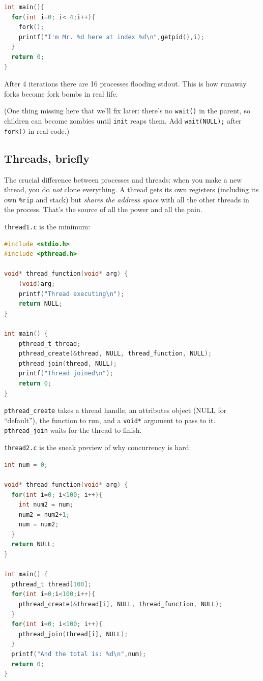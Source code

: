 \documentclass[11pt]{article}
\begin{document}
\begin{lstlisting}[language=C]
int main(){
  for(int i=0; i< 4;i++){
    fork();
    printf("I'm Mr. %d here at index %d\n",getpid(),i);
  }
  return 0;
}
\end{lstlisting}

After 4 iterations there are 16 processes flooding stdout. This is
how runaway forks become fork bombs in real life.

(One thing missing here that we'll fix later: there's no
\texttt{wait()} in the parent, so children can become zombies until
\texttt{init} reaps them. Add \texttt{wait(NULL);} after \texttt{fork()}
in real code.)

\subsection*{Threads, briefly}

The crucial difference between processes and threads: when you
make a new thread, you do \emph{not} clone everything. A thread
gets its own registers (including its own \texttt{\%rip} and stack)
but \emph{shares the address space} with all the other threads in
the process. That's the source of all the power and all the pain.

\texttt{thread1.c} is the minimum:

\begin{lstlisting}[language=C]
#include <stdio.h>
#include <pthread.h>

void* thread_function(void* arg) {
    (void)arg;
    printf("Thread executing\n");
    return NULL;
}

int main() {
    pthread_t thread;
    pthread_create(&thread, NULL, thread_function, NULL);
    pthread_join(thread, NULL);
    printf("Thread joined\n");
    return 0;
}
\end{lstlisting}

\texttt{pthread\_create} takes a thread handle, an attributes
object (NULL for ``default''), the function to run, and a
\texttt{void*} argument to pass to it. \texttt{pthread\_join} waits
for the thread to finish.

\texttt{thread2.c} is the sneak preview of why concurrency is hard:

\begin{lstlisting}[language=C]
int num = 0;

void* thread_function(void* arg) {
  for(int i=0; i<100; i++){
    int num2 = num;
    num2 = num2+1;
    num = num2;
  }
  return NULL;
}

int main() {
  pthread_t thread[100];
  for(int i=0;i<100;i++){
    pthread_create(&thread[i], NULL, thread_function, NULL);
  }
  for(int i=0; i<100; i++){
    pthread_join(thread[i], NULL);
  }
  printf("And the total is: %d\n",num);
  return 0;
}
\end{lstlisting}
\end{document}
